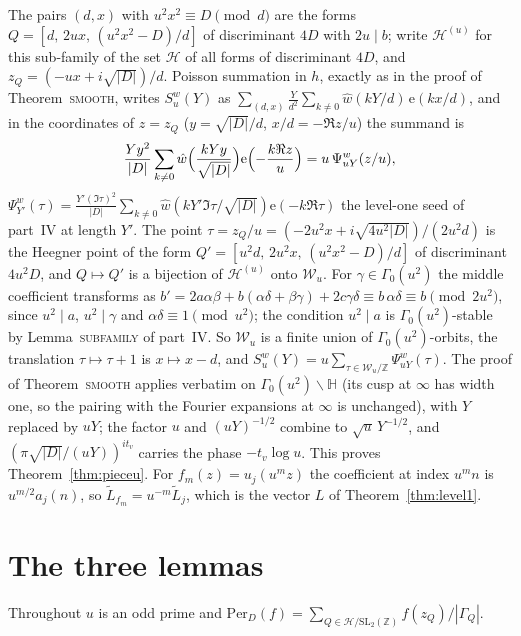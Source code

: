 \documentclass[11pt,a4paper]{article}
\theoremstyle{remark}\newtheorem{remark}[theorem]{Remark}
\newcommand{\Z}{\mathbb Z}\newcommand{\R}{\mathbb R}\newcommand{\Q}{\mathbb Q}\newcommand{\HH}{\mathbb H}
\newcommand{\e}{\mathrm e}\newcommand{\Per}{\mathrm{Per}}
\begin{document}
The pairs $(d,x)$ with $u^2x^2\equiv D\pmod d$ are the forms $Q=[d,\,2ux,\,(u^2x^2-D)/d]$ of discriminant $4D$ with
$2u\mid b$; write $\mathcal H^{(u)}$ for this sub-family of the set $\mathcal H$ of all forms of discriminant $4D$, and
$z_Q=(-ux+i\sqrt{|D|})/d$. Poisson summation in $h$, exactly as in the proof of Theorem~\textsc{smooth}, writes
$S^w_u(Y)$ as $\sum_{(d,x)}\frac{Y}{d^2}\sum_{k\ne0}\hat w(kY/d)\,\e(kx/d)$, and in the coordinates of $z=z_Q$ ($y=\sqrt{|D|}/d$,
$x/d=-\Re z/u$) the summand is
\[
\frac{Yy^2}{|D|}\sum_{k\ne0}\hat w\Bigl(\frac{kYy}{\sqrt{|D|}}\Bigr)\e\Bigl(-\frac{k\Re z}u\Bigr)=u\,\Psi^w_{uY}(z/u),
\]
$\Psi^w_{Y'}(\tau)=\frac{Y'(\Im\tau)^2}{|D|}\sum_{k\ne0}\hat w(kY'\Im\tau/\sqrt{|D|})\e(-k\Re\tau)$ the level-one seed of
part~IV at length $Y'$. The point $\tau=z_Q/u=(-2u^2x+i\sqrt{4u^2|D|})/(2u^2d)$ is the Heegner point of the form
$Q'=[u^2d,\,2u^2x,\,(u^2x^2-D)/d]$ of discriminant $4u^2D$, and $Q\mapsto Q'$ is a bijection of $\mathcal H^{(u)}$ onto
$\mathcal W_u$. For $\gamma\in\Gamma_0(u^2)$ the middle coefficient transforms as $b'=2a\alpha\beta+b(\alpha\delta+\beta\gamma)+2c\gamma\delta
\equiv b\,\alpha\delta\equiv b\pmod{2u^2}$, since $u^2\mid a$, $u^2\mid\gamma$ and $\alpha\delta\equiv1\pmod{u^2}$; the
condition $u^2\mid a$ is $\Gamma_0(u^2)$-stable by Lemma~\textsc{subfamily} of part~IV. So $\mathcal W_u$ is a finite union of
$\Gamma_0(u^2)$-orbits, the translation $\tau\mapsto\tau+1$ is $x\mapsto x-d$, and $S^w_u(Y)=u\sum_{\tau\in\mathcal W_u/\Z}\Psi^w_{uY}(\tau)$.
The proof of Theorem~\textsc{smooth} applies verbatim on $\Gamma_0(u^2)\backslash\HH$ (its cusp at $\infty$ has width one, so
the pairing with the Fourier expansions at $\infty$ is unchanged), with $Y$ replaced by $uY$; the factor $u$ and
$(uY)^{-1/2}$ combine to $\sqrt u\,Y^{-1/2}$, and $(\pi\sqrt{|D|}/(uY))^{it_v}$ carries the phase $-t_v\log u$. This proves
Theorem~\ref{thm:pieceu}. For $f_m(z)=u_j(u^mz)$ the coefficient at index $u^mn$ is $u^{m/2}a_j(n)$, so $\tilde L_{f_m}=u^{-m}\tilde L_j$,
which is the vector $L$ of Theorem~\ref{thm:level1}.

\section{The three lemmas}\label{sec:lemmas}

Throughout $u$ is an odd prime and $\Per_D(f)=\sum_{Q\in\mathcal H/\mathrm{SL}_2(\Z)}f(z_Q)/|\Gamma_Q|$.
\end{document}
